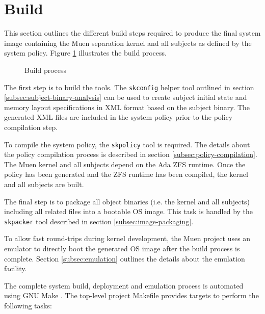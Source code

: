 \section{Build}\label{sec:build}
This section outlines the different build steps required to produce the final
system image containing the Muen separation kernel and all subjects as defined
by the system policy. Figure \ref{fig:build-process} illustrates the build
process.

\begin{figure}[h]
	\centering
	
	\caption{Build process}
	\label{fig:build-process}
\end{figure}

The first step is to build the tools. The \texttt{skconfig} helper tool
outlined in section \ref{subsec:subject-binary-analysis} can be used to create
subject initial state and memory layout specifications in XML format based on
the subject binary. The generated XML files are included in the system policy
prior to the policy compilation step.

To compile the system policy, the \texttt{skpolicy} tool is required. The
details about the policy compilation process is described in section
\ref{subsec:policy-compilation}. The Muen kernel and all subjects depend on the
Ada ZFS runtime. Once the policy has been generated and the ZFS runtime has
been compiled, the kernel and all subjects are built.

The final step is to package all object binaries (i.e. the kernel and all
subjects) including all related files into a bootable OS image. This task is
handled by the \texttt{skpacker} tool described in section
\ref{subsec:image-packaging}.

To allow fast round-trips during kernel development, the Muen project uses
an emulator to directly boot the generated OS image after the build process is
complete. Section \ref{subsec:emulation} outlines the details about the
emulation facility.

The complete system build, deployment and emulation process is automated using
GNU Make \cite{make}. The top-level project Makefile provides targets to
perform the following tasks:

